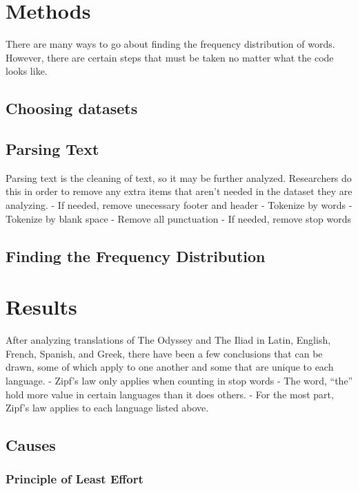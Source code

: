 \documentclass[a4paper,10pt]{article}
\newcounter{code}[section]
\begin{document}
\section{Methods}

There are many ways to go about finding the frequency distribution of words. However, there are certain steps that must be taken no matter what the code looks like.  

\subsection{Choosing datasets}


\subsection{Parsing Text}

Parsing text is the cleaning of text, so it may be further analyzed. Researchers do this in order to remove any extra items that aren’t needed in the dataset they are analyzing.  
-  If needed, remove unecessary footer and header
- Tokenize by words
- Tokenize by blank space
- Remove all punctuation
- If needed, remove stop words

\subsection{Finding the Frequency Distribution}

\section{Results}

After analyzing translations of The Odyssey and The Iliad in Latin, English, French, Spanish, and Greek, there have been a few conclusions that can be drawn, some of which apply to one another and some that are unique to each language. 
- Zipf’s law only applies when counting in stop words
- The word, “the” hold more value in certain languages than it does others.
- For the most part, Zipf’s law applies to each language listed above.



\subsection{Causes}

\subsubsection{Principle of Least Effort}
\end{document}

